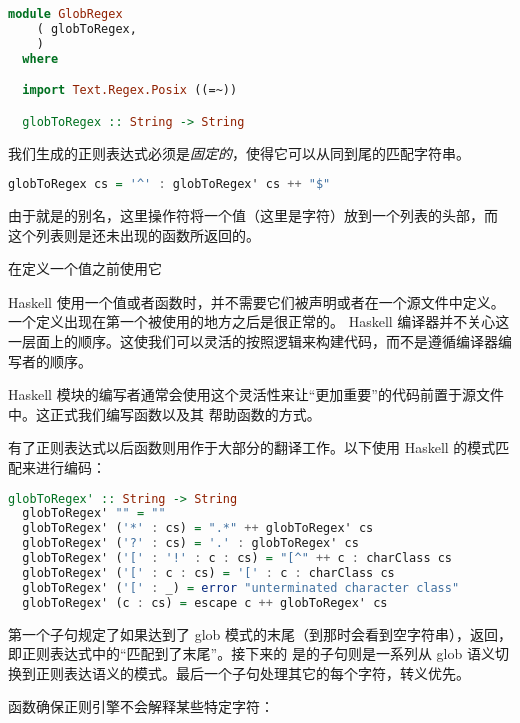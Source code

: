 \documentclass[./main.tex]{subfiles}
\begin{document}
\begin{lstlisting}[language=Haskell]
  module GlobRegex
    ( globToRegex,
    )
  where

  import Text.Regex.Posix ((=~))

  globToRegex :: String -> String
\end{lstlisting}

我们生成的正则表达式必须是\textit{固定的}，使得它可以从同到尾的匹配字符串。

\begin{lstlisting}[language=Haskell]
  globToRegex cs = '^' : globToRegex' cs ++ "$"
\end{lstlisting}

由于就是\acode{[Char]}的别名，这里\acode{:}操作符将一个值（这里是\acode{^}字符）放到一个列表的头部，而
这个列表则是还未出现的函数所返回的。

\begin{anote}
  在定义一个值之前使用它

  Haskell 使用一个值或者函数时，并不需要它们被声明或者在一个源文件中定义。一个定义出现在第一个被使用的地方之后是很正常的。
  Haskell 编译器并不关心这一层面上的顺序。这使我们可以灵活的按照逻辑来构建代码，而不是遵循编译器编写者的顺序。

  Haskell 模块的编写者通常会使用这个灵活性来让“更加重要”的代码前置于源文件中。这正式我们编写函数以及其
  帮助函数的方式。
\end{anote}

有了正则表达式以后函数则用作于大部分的翻译工作。以下使用 Haskell 的模式匹配来进行编码：

\begin{lstlisting}[language=Haskell]
  globToRegex' :: String -> String
  globToRegex' "" = ""
  globToRegex' ('*' : cs) = ".*" ++ globToRegex' cs
  globToRegex' ('?' : cs) = '.' : globToRegex' cs
  globToRegex' ('[' : '!' : c : cs) = "[^" ++ c : charClass cs
  globToRegex' ('[' : c : cs) = '[' : c : charClass cs
  globToRegex' ('[' : _) = error "unterminated character class"
  globToRegex' (c : cs) = escape c ++ globToRegex' cs
\end{lstlisting}

第一个子句规定了如果达到了 glob 模式的末尾（到那时会看到空字符串），返回\acode{\$}，即正则表达式中的“匹配到了末尾”。接下来的
是的子句则是一系列从 glob 语义切换到正则表达语义的模式。最后一个子句处理其它的每个字符，转义优先。

函数确保正则引擎不会解释某些特定字符：
\end{document}
